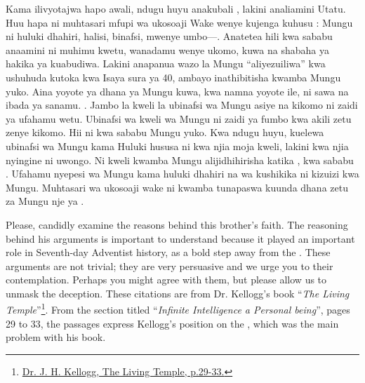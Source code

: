 Kama ilivyotajwa hapo awali, ndugu huyu anakubali , lakini analiamini Utatu. Huu hapa ni muhtasari mfupi wa ukosoaji Wake wenye kujenga kuhusu : Mungu ni huluki dhahiri, halisi, binafsi, mwenye umbo—. Anatetea hili kwa sababu anaamini ni muhimu kwetu, wanadamu wenye ukomo, kuwa na shabaha ya hakika ya kuabudiwa. Lakini anapanua wazo la Mungu “aliyezuiliwa” kwa ushuhuda kutoka kwa Isaya sura ya 40, ambayo inathibitisha kwamba Mungu yuko. Aina yoyote ya dhana ya Mungu kuwa, kwa namna yoyote ile, ni sawa na ibada ya sanamu. . Jambo la kweli la ubinafsi wa Mungu asiye na kikomo ni zaidi ya ufahamu wetu. Ubinafsi wa kweli wa Mungu ni zaidi ya fumbo kwa akili zetu zenye kikomo. Hii ni kwa sababu Mungu yuko. Kwa ndugu huyu, kuelewa ubinafsi wa Mungu kama Huluki hususa ni kwa njia moja kweli, lakini kwa njia nyingine ni uwongo. Ni kweli kwamba Mungu alijidhihirisha katika , kwa sababu . Ufahamu nyepesi wa Mungu kama huluki dhahiri na wa kushikika ni kizuizi kwa Mungu. Muhtasari wa ukosoaji wake ni kwamba tunapaswa kuunda dhana zetu za Mungu nje ya .


Please, candidly examine the reasons behind this brother’s faith. The reasoning behind his arguments is important to understand because it played an important role in Seventh-day Adventist history, as a bold step away from the . These arguments are not trivial; they are very persuasive and we urge you to their contemplation. Perhaps you might agree with them, but please allow us to unmask the deception. These citations are from Dr. Kellogg’s book “\textit{The Living Temple}”\footnote{\href{https://archive.org/details/J.H.Kellogg.TheLivingTemple1903}{Dr. J. H. Kellogg, The Living Temple, p.29-33.}}. From the section titled “\textit{Infinite Intelligence a Personal being}”, pages 29 to 33, the passages express Kellogg’s position on the , which was the main problem with his book.


